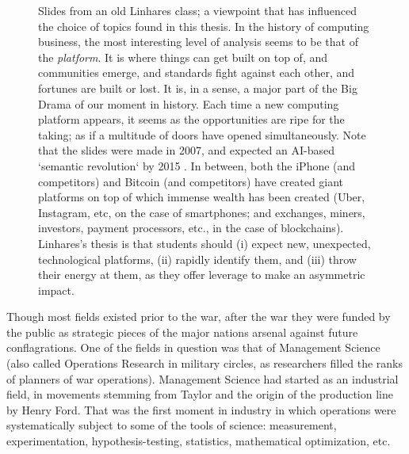 \begin{figure}[!p]

\caption{Slides from an old Linhares class; a viewpoint that has influenced the choice of topics found in this thesis.   In the history of computing business, the most interesting level of analysis seems to be that of the \emph{platform}.  It is where things can get built on top of, and communities emerge, and standards fight against each other, and fortunes are built or lost.  It is, in a sense, a major part of the Big Drama of our moment in history. Each time a new computing platform appears, it seems as the opportunities are ripe for the taking; as if a multitude of doors have opened simultaneously.  Note that the slides were made in 2007, and expected an AI-based `semantic revolution` by 2015 \citep{only-one-life}.  In between, both the iPhone (and competitors) and Bitcoin (and competitors) have created giant platforms on top of which immense wealth has been created (Uber, Instagram, etc, on the case of smartphones; and exchanges, miners, investors, payment processors, etc., in the case of blockchains).  Linhares's thesis is that students should (i) expect new, unexpected, technological platforms, (ii) rapidly identify them, and (iii) throw their energy at them, as they offer leverage to make an asymmetric impact.
\label{fig:onelife}}
\end{figure}

Though most fields existed prior to the war, after the war they were funded by the public as strategic pieces of the major nations arsenal against future conflagrations. One of the fields in question was that of Management Science (also called Operations Research in military circles, as researchers filled the ranks of planners of war operations). Management Science had started as an industrial field, in movements stemming from Taylor and the origin of the production line by Henry Ford.  That was the first moment in industry in which operations were systematically subject to some of the tools of science: measurement, experimentation, hypothesis-testing, statistics, mathematical optimization, etc.

